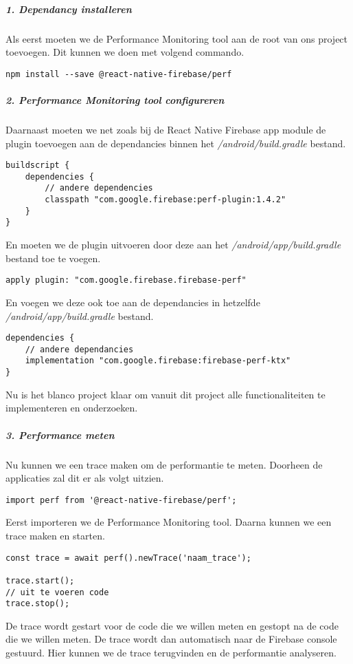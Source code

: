 \subparagraph{1. Dependancy installeren}
Als eerst moeten we de Performance Monitoring tool aan de root van ons project toevoegen. 
Dit kunnen we doen met volgend commando.
\begin{verbatim}
npm install --save @react-native-firebase/perf
\end{verbatim}

\subparagraph{2. Performance Monitoring tool configureren}
Daarnaast moeten we net zoals bij de React Native Firebase app module de plugin toevoegen aan 
de dependancies binnen het \textit{/android/build.gradle} bestand. 
\begin{verbatim}
buildscript {
    dependencies {
        // andere dependencies
        classpath "com.google.firebase:perf-plugin:1.4.2"
    }
}
\end{verbatim}
En moeten we de plugin uitvoeren door deze aan het \textit{/android/app/build.gradle} bestand toe te voegen.
\begin{verbatim}
apply plugin: "com.google.firebase.firebase-perf"
\end{verbatim}
En voegen we deze ook toe aan de dependancies in hetzelfde \textit{/android/app/build.gradle} bestand.
\begin{verbatim}
dependencies {
    // andere dependancies
    implementation "com.google.firebase:firebase-perf-ktx"
}
\end{verbatim}
Nu is het blanco project klaar om vanuit dit project alle functionaliteiten te 
implementeren en onderzoeken.

\subparagraph{3. Performance meten}
Nu kunnen we een trace maken om de performantie te meten. Doorheen de applicaties zal dit er als 
volgt uitzien.
\begin{verbatim}
import perf from '@react-native-firebase/perf';
\end{verbatim}
Eerst importeren we de Performance Monitoring tool. Daarna kunnen we een trace maken en starten.
\begin{verbatim}
const trace = await perf().newTrace('naam_trace');

trace.start();
// uit te voeren code
trace.stop();

\end{verbatim}
De trace wordt gestart voor de code die we willen meten en gestopt na de code die we willen meten.
De trace wordt dan automatisch naar de Firebase console gestuurd. Hier kunnen we de trace terugvinden
en de performantie analyseren.